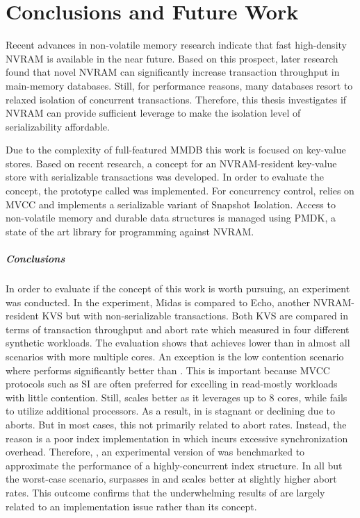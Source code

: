 \chapter{Conclusions and Future Work}
\label{ch:summary}

Recent advances in non-volatile memory research indicate that fast high-density
NVRAM is available in the near future. Based on this prospect, later research
found that novel NVRAM can significantly increase transaction throughput in
main-memory databases. Still, for performance reasons, many databases resort to
relaxed isolation of concurrent transactions. Therefore, this thesis
investigates if NVRAM can provide sufficient leverage to make the isolation
level of serializability affordable.

Due to the complexity of full-featured MMDB this work is focused on key-value
stores. Based on recent research, a concept for an NVRAM-resident key-value
store with serializable transactions was developed. In order to evaluate the
concept, the prototype called \midas was implemented. For concurrency control,
\midas relies on MVCC and implements a serializable variant of Snapshot
Isolation. Access to non-volatile memory and durable data structures is managed
using PMDK, a state of the art library for programming against NVRAM.

\paragraph{Conclusions}

In order to evaluate if the concept of this work is worth pursuing, an
experiment was conducted. In the experiment, Midas is compared to Echo, another
NVRAM-resident KVS but with non-serializable transactions. Both KVS are compared
in terms of transaction throughput and abort rate which measured in four
different synthetic workloads. The evaluation shows that \midas achieves lower
\ttp than \echo in almost all scenarios with more multiple cores. An exception
is the low contention scenario where \midas performs significantly better than
\echo. This is important because MVCC protocols such as SI are often preferred
for excelling in read-mostly workloads with little contention. Still, \echo
scales better as it leverages up to 8 cores, while \midas fails to utilize
additional processors. As a result, \ttp in \midas is stagnant or declining due
to aborts. But in most cases, this not primarily related to abort rates.
Instead, the reason is a poor index implementation in \midas which incurs
excessive synchronization overhead. Therefore, \midasopt, an experimental
version of \midas was benchmarked to approximate the performance of a
highly-concurrent index structure. In all but the worst-case scenario, \midasopt
surpasses \echo in \ttp and scales better at slightly higher abort rates. This
outcome confirms that the underwhelming results of \midas are largely related to
an implementation issue rather than its concept.

